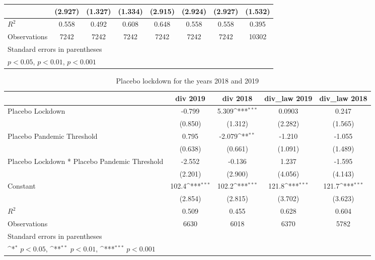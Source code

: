 \documentclass{article}
\begin{document}
{\begin{longtable}{l*{7}{c}}
                &  (2.927)         &  (1.327)         &  (1.334)         &  (2.915)         &  (2.924)         &  (2.927)         &  (1.532)         \\
\hline
\(R^{2}\)       &    0.558         &    0.492         &    0.608         &    0.648         &    0.558         &    0.558         &    0.395         \\
Observations    &     7242         &     7242         &     7242         &     7242         &     7242         &     7242         &    10302         \\
\hline\hline
\multicolumn{8}{l}{\footnotesize Standard errors in parentheses}\\
\multicolumn{8}{l}{\footnotesize \sym{*} \(p<0.05\), \sym{**} \(p<0.01\), \sym{***} \(p<0.001\)}\\
\end{longtable}
}

{
\def\sym#1{\ifmmode^{#1}\else\(^{#1}\)\fi}
\begin{longtable}{l*{4}{c}}
\caption{Placebo lockdown for the years 2018 and 2019}\\
\hline\hline\endfirsthead\hline\endhead\hline\endfoot\endlastfoot
                &\multicolumn{1}{c}{div 2019}&\multicolumn{1}{c}{div 2018}&\multicolumn{1}{c}{div\_law 2019}&\multicolumn{1}{c}{div\_law 2018}\\
\hline
Placebo Lockdown&   -0.799         &    5.309\sym{***}&   0.0903         &    0.247         \\
                &  (0.850)         &  (1.312)         &  (2.282)         &  (1.565)         \\
Placebo Pandemic Threshold&    0.795         &   -2.079\sym{**} &   -1.210         &   -1.055         \\
                &  (0.638)         &  (0.661)         &  (1.091)         &  (1.489)         \\
Placebo Lockdown * Placebo Pandemic Threshold&   -2.552         &   -0.136         &    1.237         &   -1.595         \\
                &  (2.201)         &  (2.900)         &  (4.056)         &  (4.143)         \\
Constant        &    102.4\sym{***}&    102.2\sym{***}&    121.8\sym{***}&    121.7\sym{***}\\
                &  (2.854)         &  (2.815)         &  (3.702)         &  (3.623)         \\
\hline
\(R^{2}\)       &    0.509         &    0.455         &    0.628         &    0.604         \\
Observations    &     6630         &     6018         &     6370         &     5782         \\
\hline\hline
\multicolumn{5}{l}{\footnotesize Standard errors in parentheses}\\
\multicolumn{5}{l}{\footnotesize \sym{*} \(p<0.05\), \sym{**} \(p<0.01\), \sym{***} \(p<0.001\)}\\
\end{longtable}
}
\end{document}
